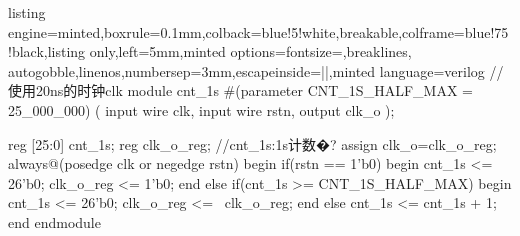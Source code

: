 \documentclass[a4paper]{article}
\begin{document}
\begin{tcblisting}{listing engine=minted,boxrule=0.1mm,colback=blue!5!white,breakable,colframe=blue!75!black,listing only,left=5mm,minted options={fontsize=\small,breaklines, autogobble,linenos,numbersep=3mm,escapeinside=||},minted language=verilog}
//使用20ns的时钟clk
module cnt_1s #(parameter CNT_1S_HALF_MAX = 25_000_000)
(
	input wire clk,
	input wire rstn,
	output clk_o
);

reg	[25:0] cnt_1s;
reg clk_o_reg;
//cnt_1s:1s计数�?
assign clk_o=clk_o_reg;
always@(posedge clk or negedge rstn) begin
	if(rstn == 1'b0) begin
		cnt_1s <= 26'b0;
        clk_o_reg <=	1'b0;
		end
	else if(cnt_1s >= CNT_1S_HALF_MAX) begin
		cnt_1s <= 26'b0;
        clk_o_reg <=	~clk_o_reg;
		end
	else
		cnt_1s <= cnt_1s + 1;
	end
endmodule
\end{tcblisting}





\end{document}

